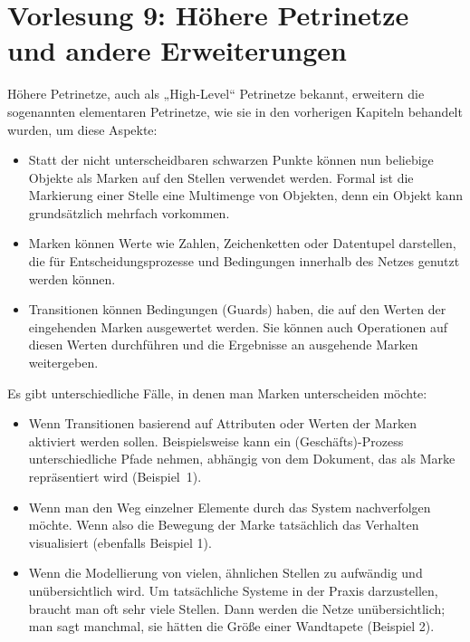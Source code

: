 \section{Vorlesung 9: Höhere Petrinetze und andere Erweiterungen}

Höhere Petrinetze, auch als „High-Level“ Petrinetze bekannt, erweitern die sogenannten elementaren Petrinetze, wie sie in den vorherigen Kapiteln behandelt wurden, um diese Aspekte:
\begin{itemize}
	\item Statt der nicht unterscheidbaren schwarzen Punkte können nun beliebige Objekte als Marken auf den Stellen verwendet werden. Formal ist die Markierung einer Stelle eine Multimenge von Objekten, denn ein Objekt kann grundsätzlich mehrfach vorkommen.
	
	\item Marken können Werte wie Zahlen, Zeichenketten oder Datentupel darstellen, die für Entscheidungsprozesse und Bedingungen innerhalb des Netzes genutzt werden können.
	
	\item Transitionen können Bedingungen (Guards) haben, die auf den Werten der eingehenden Marken ausgewertet werden. Sie können auch Operationen auf diesen Werten durchführen und die Ergebnisse an ausgehende Marken weitergeben.
\end{itemize}

Es gibt unterschiedliche Fälle, in denen man Marken unterscheiden möchte:
\begin{itemize}
	
	\item Wenn Transitionen basierend auf Attributen oder Werten der Marken aktiviert werden sollen. Beispielsweise kann ein (Geschäfts)-Prozess unter\-schied\-liche Pfade nehmen, abhängig von dem Dokument, das als Marke repräsentiert wird (Beispiel~1).
	
	\item Wenn man den Weg einzelner Elemente durch das System nachverfolgen möchte. Wenn also die Bewegung der Marke tatsächlich das Verhalten visualisiert (ebenfalls Beispiel 1).
	
	\item Wenn die Modellierung von vielen, ähnlichen Stellen zu aufwändig und unübersichtlich wird. Um tatsächliche Systeme in der Praxis darzustellen, braucht man oft sehr viele Stellen. Dann werden die Netze unübersichtlich; man sagt manchmal, sie hätten die Größe einer Wandtapete (Beispiel 2).
	
\end{itemize}

